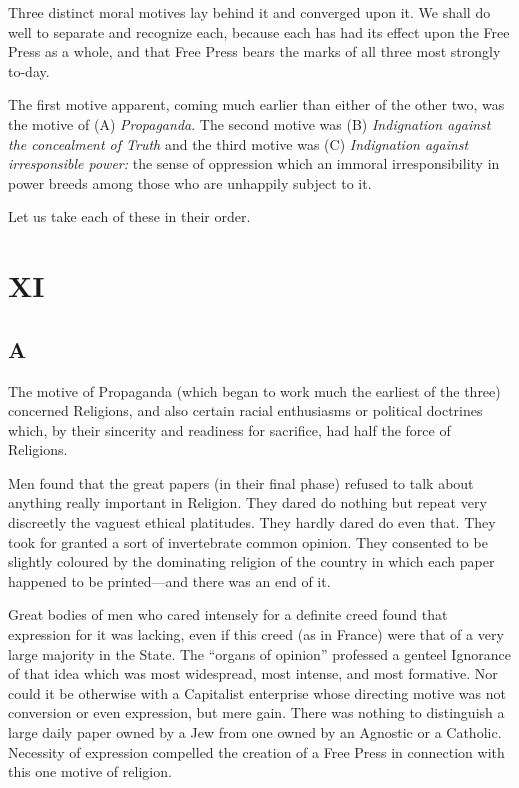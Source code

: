 \documentclass{book}
\begin{document}
Three distinct moral motives lay behind it and converged upon it. We shall do well to separate and recognize each, because each has had its effect upon the Free Press as a whole, and that Free Press bears the marks of all three most strongly to-day.

The first motive apparent, coming much earlier than either of the other two, was the motive of (A) \emph{Propaganda}. The second motive was (B) \emph{Indignation against the concealment of Truth} and the third motive was (C) \emph{Indignation against irresponsible power:} the sense of oppression which an immoral irresponsibility in power breeds among those who are unhappily subject to it.

Let us take each of these in their order.

\chapter*{XI}
\label{chapter-12}
\section*{A}
The motive of Propaganda (which began to work much the earliest of the three) concerned Religions, and also certain racial enthusiasms or political doctrines which, by their sincerity and readiness for sacrifice, had half the force of Religions.

Men found that the great papers (in their final phase) refused to talk about anything really important in Religion. They dared do nothing but repeat very discreetly the vaguest ethical platitudes. They hardly dared do even that. They took for granted a sort of invertebrate common opinion. They consented to be slightly coloured by the dominating religion of the country in which each paper happened to be printed—and there was an end of it.

Great bodies of men who cared intensely for a definite creed found that expression for it was lacking, even if this creed (as in France) were that of a very large majority in the State. The “organs of opinion” professed a genteel Ignorance of that idea which was most widespread, most intense, and most formative. Nor could it be otherwise with a Capitalist enterprise whose directing motive was not conversion or even expression, but mere gain. There was nothing to distinguish a large daily paper owned by a Jew from one owned by an Agnostic or a Catholic. Necessity of expression compelled the creation of a Free Press in connection with this one motive of religion.
\end{document}
